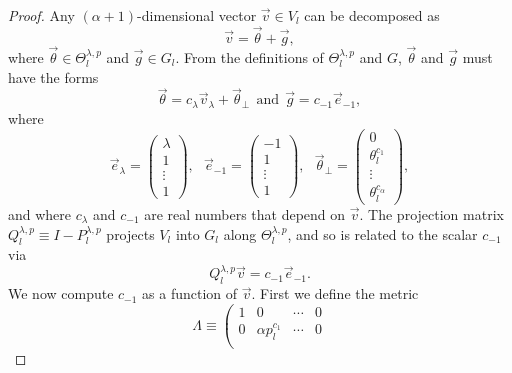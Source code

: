 \documentclass{article}
\numberwithin{myclaim}{section}
\begin{document}
\begin{proof}

Any $(\alpha+1)$-dimensional vector $\vec{v} \in V_l$ can be decomposed as 
\begin{equation}
    \vec{v} = \vec{\theta} + \vec{g},   
\end{equation}
where $\vec{\theta} \in \Theta^{\lambda,p}_l$ and $\vec{g} \in G_l$. From the definitions of $\Theta^{\lambda,p}_l$ and $G$, $\vec{\theta}$ and $\vec{g}$ must have the forms
\begin{equation}
    \vec{\theta} = c_\lambda \vec{v}_\lambda + \vec{\theta}_\perp~~\textrm{and}~~\vec{g} = c_{-1} \vec{e}_{-1},
\end{equation}
where 
\begin{equation}
    \vec{e}_\lambda = \left( \begin{array}{c}
        \lambda \\ 
        1 \\ 
        \vdots \\ 
        1 \end{array} 
    \right),~~~
    \vec{e}_{-1} = \left( 
    \begin{array}{c}
        -1 \\ 
        1  \\ 
        \vdots \\ 
        1 
    \end{array} \right),~~~
     \vec{\theta}_\perp = \left( 
    \begin{array}{c} 
        0 \\ 
        \theta_l^{c_1} \\ 
        \vdots \\ 
        \theta_l^{c_\alpha}  
    \end{array} \right),
\end{equation}
and where $c_{\lambda}$ and $c_{-1}$ are real numbers that depend on $\vec{v}$. The projection matrix $Q_l^{\lambda,p} \equiv I - P_l^{\lambda,p}$ projects $V_l$ into $G_l$ along $\Theta_l^{\lambda,p}$, and so is related to the scalar $c_{-1}$ via
\begin{equation}
    Q_l^{\lambda,p} \vec{v} = c_{-1} \vec{e}_{-1}.
\end{equation}
We now compute $c_{-1}$ as a function of $\vec{v}$. First we define the metric
\begin{equation}
    \Lambda \equiv \left( 
\begin{array}{cccc} 
    1 & 0 & \cdots & 0 \\
    0 & \alpha p_l^{c_1} & \cdots & 0 \\

\end{array}
\end{equation}
\end{proof}
\end{document}
